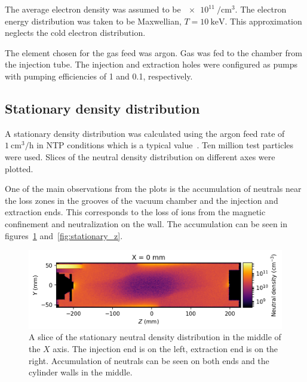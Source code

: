 \documentclass[a4paper,twoside,12pt]{article}
\begin{document}
The average electron density was assumed to be $\SI{e11}{\per\centi\meter\cubed}$. The electron energy distribution was taken to be Maxwellian, $T = \SI{10}{\kilo\electronvolt}$. This approximation neglects the cold electron distribution.

The element chosen for the gas feed was argon. Gas was fed to the chamber from the injection tube. The injection and extraction holes were configured as pumps with pumping efficiencies of 1 and 0.1, respectively.

\subsection{Stationary density distribution}
A stationary density distribution was calculated using the argon feed rate of
$\SI{1}{\centi\metre\cubed\per\hour}$ in NTP conditions which is a typical
value~\cite{tarvainen:phd}. Ten million test particles were used. Slices of the neutral density distribution on different axes were plotted.

One of the main observations from the plots is the accumulation of neutrals near the loss zones in the grooves of the vacuum chamber and the injection and extraction ends. This corresponds to the loss of ions from the magnetic confinement and neutralization on the wall. The accumulation can be seen in figures~\ref{fig:stationary_x} and~\ref{fig:stationary_z}.

\begin{figure}
    \centering
    \includegraphics[width=\textwidth]{images/stationary_x_middle.png}
    \caption{A slice of the stationary neutral density distribution in the
    middle of the $X$ axis. The injection end is on the left, extraction end is
    on the right. Accumulation of neutrals can be seen on both ends and the
    cylinder walls in the middle.}
    \label{fig:stationary_x}
\end{figure}
\end{document}

